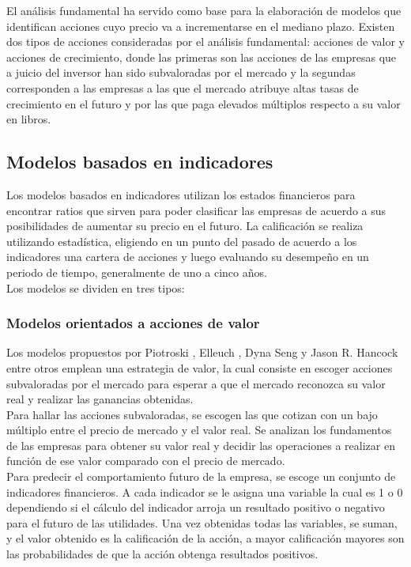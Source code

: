El an\'alisis fundamental ha servido como base para la elaboraci\'on de modelos que identifican acciones cuyo precio va a incrementarse en el mediano plazo. Existen dos tipos de acciones consideradas por el an\'alisis fundamental: acciones de valor y acciones de crecimiento, donde las primeras son las acciones de las empresas que a juicio del inversor han sido subvaloradas por el mercado y la segundas corresponden a las empresas a las que el mercado atribuye altas tasas de crecimiento en el futuro y por las que paga elevados múltiplos respecto a su valor en libros.\\

\subsection{Modelos basados en indicadores}

Los modelos basados en indicadores utilizan los estados financieros para encontrar ratios que sirven para poder clasificar las empresas de acuerdo a sus posibilidades de aumentar su precio en el futuro. La calificación se realiza utilizando estad\'istica, eligiendo en un punto del pasado de acuerdo a los indicadores una cartera de acciones y luego evaluando su desempeño en un periodo de tiempo, generalmente de uno a cinco años.\\

Los modelos se dividen en tres tipos:\\

\subsubsection{Modelos orientados a acciones de valor}

Los modelos propuestos por Piotroski \cite{Piotroski2000}, Elleuch \cite{Elleuch2009}, Dyna Seng y Jason R. Hancock \cite{DynaSeng2012} entre otros emplean una estrategia de valor, la cual consiste en escoger acciones subvaloradas por el mercado para esperar a que el mercado reconozca su valor real y realizar las ganancias obtenidas.\\

Para hallar las acciones subvaloradas, se escogen las que cotizan con un bajo múltiplo entre el precio de mercado y el valor real. Se analizan los fundamentos de las empresas para obtener su valor real y decidir las operaciones a realizar en funci\'on de ese valor comparado con el precio de mercado.\\

Para predecir el comportamiento futuro de la empresa, se escoge un conjunto de indicadores financieros. A cada indicador se le asigna una variable la cual es 1 o 0 dependiendo si el c\'alculo del indicador arroja un resultado positivo o negativo para el futuro de las utilidades. Una vez obtenidas todas las variables, se suman, y el valor obtenido es la calificaci\'on de la acci\'on, a mayor calificaci\'on mayores son las probabilidades de que la acci\'on obtenga resultados positivos.\\

